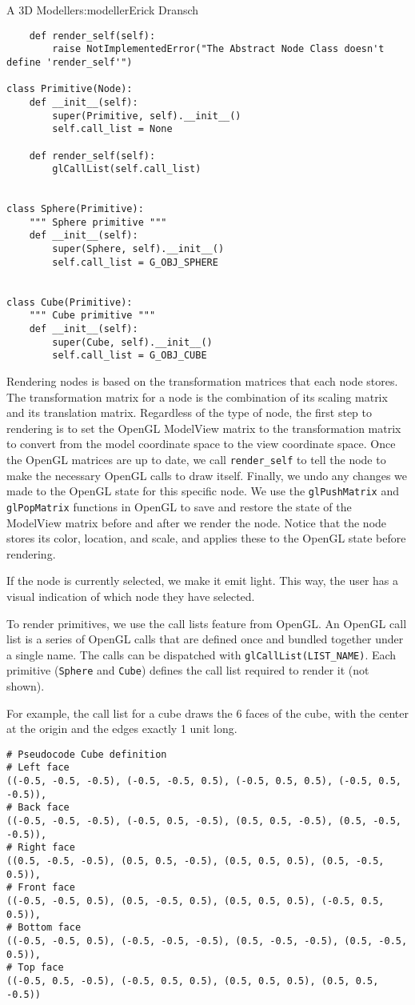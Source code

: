 \begin{aosachapter}{A 3D Modeller}{s:modeller}{Erick Dransch}
\begin{verbatim}
    def render_self(self):
        raise NotImplementedError("The Abstract Node Class doesn't define 'render_self'")

class Primitive(Node):
    def __init__(self):
        super(Primitive, self).__init__()
        self.call_list = None

    def render_self(self):
        glCallList(self.call_list)


class Sphere(Primitive):
    """ Sphere primitive """
    def __init__(self):
        super(Sphere, self).__init__()
        self.call_list = G_OBJ_SPHERE


class Cube(Primitive):
    """ Cube primitive """
    def __init__(self):
        super(Cube, self).__init__()
        self.call_list = G_OBJ_CUBE
\end{verbatim}

Rendering nodes is based on the transformation matrices that each node
stores. The transformation matrix for a node is the combination of its
scaling matrix and its translation matrix. Regardless of the type of
node, the first step to rendering is to set the OpenGL ModelView matrix
to the transformation matrix to convert from the model coordinate space
to the view coordinate space. Once the OpenGL matrices are up to date,
we call \texttt{render\_self} to tell the node to make the necessary
OpenGL calls to draw itself. Finally, we undo any changes we made to the
OpenGL state for this specific node. We use the \texttt{glPushMatrix}
and \texttt{glPopMatrix} functions in OpenGL to save and restore the
state of the ModelView matrix before and after we render the node.
Notice that the node stores its color, location, and scale, and applies
these to the OpenGL state before rendering.

If the node is currently selected, we make it emit light. This way, the
user has a visual indication of which node they have selected.

To render primitives, we use the call lists feature from OpenGL. An
OpenGL call list is a series of OpenGL calls that are defined once and
bundled together under a single name. The calls can be dispatched with
\texttt{glCallList(LIST\_NAME)}. Each primitive (\texttt{Sphere} and
\texttt{Cube}) defines the call list required to render it (not shown).

For example, the call list for a cube draws the 6 faces of the cube,
with the center at the origin and the edges exactly 1 unit long.

\begin{verbatim}
# Pseudocode Cube definition
# Left face
((-0.5, -0.5, -0.5), (-0.5, -0.5, 0.5), (-0.5, 0.5, 0.5), (-0.5, 0.5, -0.5)),
# Back face
((-0.5, -0.5, -0.5), (-0.5, 0.5, -0.5), (0.5, 0.5, -0.5), (0.5, -0.5, -0.5)),
# Right face
((0.5, -0.5, -0.5), (0.5, 0.5, -0.5), (0.5, 0.5, 0.5), (0.5, -0.5, 0.5)),
# Front face
((-0.5, -0.5, 0.5), (0.5, -0.5, 0.5), (0.5, 0.5, 0.5), (-0.5, 0.5, 0.5)),
# Bottom face
((-0.5, -0.5, 0.5), (-0.5, -0.5, -0.5), (0.5, -0.5, -0.5), (0.5, -0.5, 0.5)),
# Top face
((-0.5, 0.5, -0.5), (-0.5, 0.5, 0.5), (0.5, 0.5, 0.5), (0.5, 0.5, -0.5))
\end{verbatim}


\end{aosachapter}
